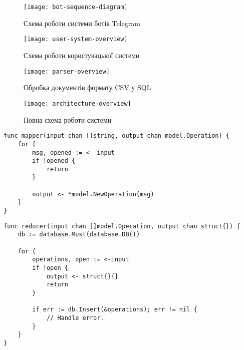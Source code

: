 \chapter{}

\begin{figure}[ht]
\centering
\texttt{[image: bot-sequence-diagram]}
\caption{Схема роботи системи ботів Telegram}
\label{fig:bot-sequence-diagram}
\end{figure}

\begin{figure}[ht]
\centering
\texttt{[image: user-system-overview]}
\caption{Схема роботи користувацької системи}
\label{fig:user-system-overview}
\end{figure}

\begin{figure}[ht]
\centering
\texttt{[image: parser-overview]}
\caption{Обробка документів формату CSV у SQL}
\label{fig:parser-overview}
\end{figure}

\begin{figure}[ht]
\centering
\texttt{[image: architecture-overview]}
\caption{Повна схема роботи системи}
\label{fig:architecture-overview}
\end{figure}

\pagebreak

\begin{lstlisting}[caption={Реалізація функції Map},captionpos=b]
func mapper(input chan []string, output chan model.Operation) {
	for {
		msg, opened := <- input
		if !opened {
			return
		}

		output <- *model.NewOperation(msg)
	}
}
\end{lstlisting}

\begin{lstlisting}[caption={Реалізація функції Reduce},captionpos=b]
func reducer(input chan []model.Operation, output chan struct{}) {
	db := database.Must(database.DB())

	for {
		operations, open := <-input
		if !open {
			output <- struct{}{}
			return
		}

		if err := db.Insert(&operations); err != nil {
			// Handle error.
		}
	}
}
\end{lstlisting}
